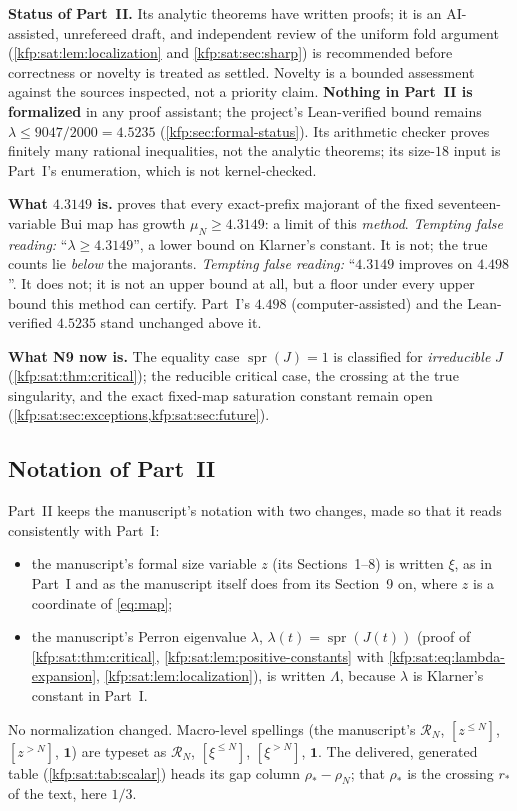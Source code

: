 \documentclass[11pt,a4paper]{article}
\theoremstyle{definition}
\theoremstyle{remark}
\newcommand{\bone}{\boldsymbol 1}
\newcommand{\spr}{\operatorname{spr}}
\newcommand{\strunc}[1]{[\xi^{\le #1}]}
\newcommand{\shigh}[1]{[\xi^{>#1}]}
\newcommand{\satR}{\mathcal R}
\begin{document}
\begin{resultbox}
\textbf{Status of Part~II.} Its analytic theorems have written proofs; it is
an AI-assisted, unrefereed draft, and independent review of the uniform fold
argument (\cref{kfp:sat:lem:localization} and \cref{kfp:sat:sec:sharp}) is
recommended before correctness or novelty is treated as settled. Novelty is
a bounded assessment against the sources inspected, not a priority claim.
\textbf{Nothing in Part~II is formalized} in any proof assistant; the
project's Lean-verified bound remains $\lambda\le9047/2000=4.5235$
(\cref{kfp:sec:formal-status}). Its arithmetic checker proves finitely many
rational inequalities, not the analytic theorems; its size-$18$ input is
Part~I's enumeration, which is not kernel-checked.

\smallskip
\textbf{What $4.3149$ is.}  proves that every
exact-prefix majorant of the fixed seventeen-variable Bui map has growth
$\mu_N\ge4.3149$: a limit of this \emph{method}. \emph{Tempting false
reading:} ``$\lambda\ge4.3149$'', a lower bound on Klarner's constant. It is
not; the true counts lie \emph{below} the majorants. \emph{Tempting false
reading:} ``$4.3149$ improves on $4.498$''. It does not; it is not an upper
bound at all, but a floor under every upper bound this method can certify.
Part~I's $4.498$ (computer-assisted) and the Lean-verified $4.5235$ stand
unchanged above it.

\smallskip
\textbf{What N9 now is.} The equality case $\spr(J)=1$ is classified for
\emph{irreducible} $J$ (\cref{kfp:sat:thm:critical}); the reducible critical
case, the crossing at the true singularity, and the exact fixed-map
saturation constant remain open (\cref{kfp:sat:sec:exceptions,kfp:sat:sec:future}).
\end{resultbox}

\subsection{Notation of Part~II}
\label{kfp:sat:sec:notation}
Part~II keeps the manuscript's notation with two changes, made so that it
reads consistently with Part~I:
\begin{itemize}
\item the manuscript's formal size variable $z$ (its Sections~1--8) is
written $\xi$, as in Part~I and as the manuscript itself does from its
Section~9 on, where $z$ is a coordinate of \eqref{eq:map};
\item the manuscript's Perron eigenvalue $\lambda$, $\lambda(t)=\spr(J(t))$
(proof of \cref{kfp:sat:thm:critical}, \cref{kfp:sat:lem:positive-constants}
with \eqref{kfp:sat:eq:lambda-expansion}, \cref{kfp:sat:lem:localization}),
is written $\Lambda$, because $\lambda$ is Klarner's constant in Part~I.
\end{itemize}
No normalization changed. Macro-level spellings (the manuscript's
$\mathcal R_N$, $[z^{\le N}]$, $[z^{>N}]$, $\mathbf 1$) are typeset as
$\satR_N$, $\strunc N$, $\shigh N$, $\bone$. The delivered, generated table
 (\cref{kfp:sat:tab:scalar})
heads its gap column $\rho_*-\rho_N$; that $\rho_*$ is the crossing $r_*$
of the text, here $1/3$.
\end{document}
